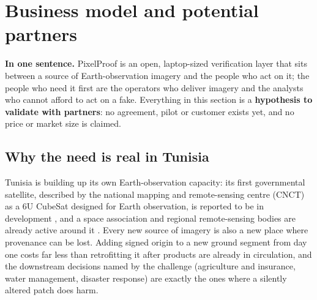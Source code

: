 \section{Business model and potential partners}\label{sec:biz}
\begin{keybox}
\textbf{In one sentence.} PixelProof is an open, laptop-sized verification layer that sits between a source of Earth-observation imagery and the people who act on it; the people who need it first are the operators who deliver imagery and the analysts who cannot afford to act on a fake. Everything in this section is a \textbf{hypothesis to validate with partners}: no agreement, pilot or customer exists yet, and no price or market size is claimed.
\end{keybox}

\subsection{Why the need is real in Tunisia}
Tunisia is building up its own Earth-observation capacity: its first governmental satellite, described by the national mapping and remote-sensing centre (CNCT) as a 6U CubeSat designed for Earth observation, is reported to be in development \cite{tnsat}, and a space association and regional remote-sensing bodies are already active around it \cite{tunsa}. Every new source of imagery is also a new place where provenance can be lost. Adding signed origin to a new ground segment from day one costs far less than retrofitting it after products are already in circulation, and the downstream decisions named by the challenge (agriculture and insurance, water management, disaster response) are exactly the ones where a silently altered patch does harm.

